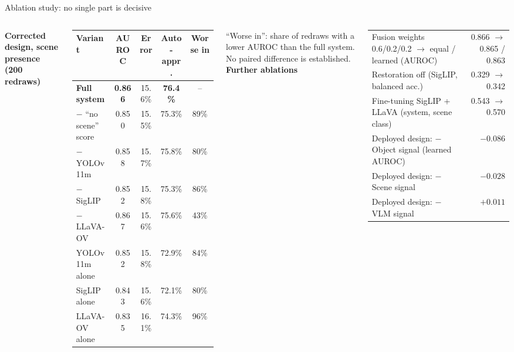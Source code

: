 \documentclass[aspectratio=169,10pt]{beamer}
\begin{document}
\begin{frame}{Ablation study: no single part is decisive}
\begin{columns}[T,onlytextwidth]
\textbf{\color{navy}Corrected design, scene presence (200 redraws)}\par\vspace{2pt}
\footnotesize\renewcommand{\arraystretch}{1.18}
\begin{tabular}{@{}l c c c c@{}}
\toprule
Variant & AUROC & Error & Auto-appr. & Worse in\\
\midrule
\textbf{Full system} & \textbf{0.866} & 15.6\% & \textbf{76.4\%} & --\\
$-$ ``no scene'' score & 0.850 & 15.5\% & 75.3\% & 89\%\\
$-$ YOLOv11m & 0.858 & 15.7\% & 75.8\% & 80\%\\
$-$ SigLIP & 0.852 & 15.8\% & 75.3\% & 86\%\\
$-$ LLaVA-OV & 0.867 & 15.6\% & 75.6\% & 43\%\\
\midrule
YOLOv11m alone & 0.852 & 15.8\% & 72.9\% & 84\%\\
SigLIP alone & 0.843 & 15.6\% & 72.1\% & 80\%\\
LLaVA-OV alone & 0.835 & 16.1\% & 74.3\% & 96\%\\
\bottomrule
\end{tabular}\par\vspace{2pt}
{\scriptsize\color{muted}``Worse in'': share of redraws with a lower AUROC than the full system. No paired difference is established.}
\textbf{\color{navy}Further ablations}\par\vspace{3pt}
\scriptsize
\renewcommand{\arraystretch}{1.25}
\begin{tabularx}{\linewidth}{@{}>{\raggedright\arraybackslash}X r@{}}
\toprule
Fusion weights 0.6/0.2/0.2 $\to$ equal / learned (AUROC) & 0.866 $\to$ 0.865 / 0.863\\
Restoration off (SigLIP, balanced acc.) & 0.329 $\to$ 0.342\\
Fine-tuning SigLIP + LLaVA (system, scene class) & 0.543 $\to$ 0.570\\
Deployed design: $-$Object signal (learned AUROC) & $-0.086$\\
Deployed design: $-$Scene signal & $-0.028$\\
Deployed design: $-$VLM signal & $+0.011$\\
\bottomrule
\end{tabularx}\par\vspace{3pt}

\end{columns}
\end{frame}
\end{document}
